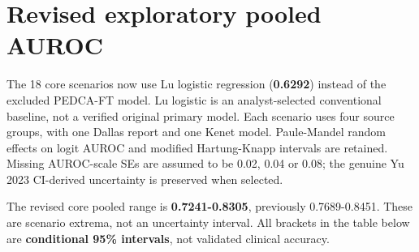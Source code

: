 \documentclass[10pt,a4paper]{article}
\begin{document}
\section*{Revised exploratory pooled AUROC}
The 18 core scenarios now use Lu logistic regression (\textbf{0.6292}) instead of the excluded PEDCA-FT model. Lu logistic is an analyst-selected conventional baseline, not a verified original primary model. Each scenario uses four source groups, with one Dallas report and one Kenet model. Paule-Mandel random effects on logit AUROC and modified Hartung-Knapp intervals are retained. Missing AUROC-scale SEs are assumed to be 0.02, 0.04 or 0.08; the genuine Yu 2023 CI-derived uncertainty is preserved when selected.

The revised core pooled range is \textbf{0.7241-0.8305}, previously 0.7689-0.8451. These are scenario extrema, not an uncertainty interval. All brackets in the table below are \textbf{conditional 95\% intervals}, not validated clinical accuracy.
\end{document}
